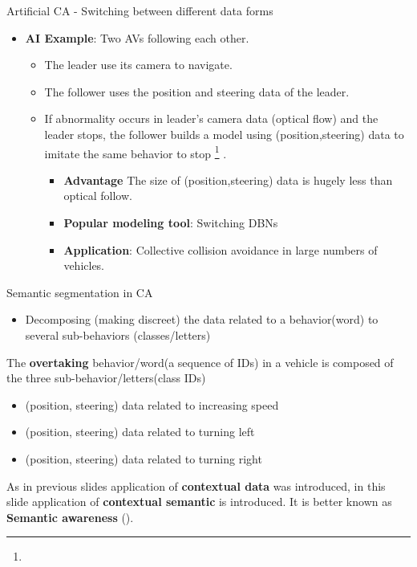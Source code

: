 \documentclass[unknownkeysallowed]{beamer}
\begin{document}
\begin{frame}{Artificial CA - Switching between different data forms}
	\begin{itemize}
		\item \textbf{AI Example}: Two AVs following each other. 
		\begin{itemize}
			\item The leader use its camera to navigate.
			\item The follower uses the position and steering data of the leader.
			\item If abnormality occurs in leader's camera data (optical flow) and the leader stops, the follower builds a model using (position,steering) data to imitate the same behavior to stop
			 \footnote{\tiny{}} \textbf{\cite{regazzoni-2020-multi-sensorial-generative-and-descriptive-self-awareness-models-for-autonomous-systems,kanapram-2019-self-awareness-in-intelligent-vehicles-experience-based-abnormality-detection}}. 
			 \begin{itemize}
			 	\item \textbf{Advantage} The size of (position,steering) data is hugely less than optical follow.
			 	\item \textbf{Popular modeling tool}: Switching DBNs
			 	\item \textbf{Application}: Collective collision avoidance in large numbers of vehicles.
			 \end{itemize}
		\end{itemize}
		
	\end{itemize}
\end{frame}

\begin{frame}{Semantic segmentation in CA}
	\begin{itemize}
		\item Decomposing (making discreet) the data related to a behavior(word) to several sub-behaviors (classes/letters)
	\end{itemize}
	The \textbf{overtaking} behavior/word(a sequence of IDs) in a vehicle is composed of the three sub-behavior/letters(class IDs)
	\begin{itemize}
		\item (position, steering) data related to increasing speed
		\item (position, steering) data related to turning left
		\item (position, steering) data related to turning right
	\end{itemize}
	As in previous slides application of \textbf{contextual data} was introduced, in this slide application of \textbf{contextual semantic} is introduced. It is better known as \textbf{Semantic awareness} (\textbf{\cite{regazzoni-2020-multi-sensorial-generative-and-descriptive-self-awareness-models-for-autonomous-systems}}).
\end{frame}
\end{document}
